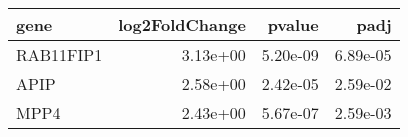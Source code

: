 \begin{tabular}{lrrr}
\toprule
     gene &  log2FoldChange &   pvalue &     padj \\
\midrule
RAB11FIP1 &        3.13e+00 & 5.20e-09 & 6.89e-05 \\
     APIP &        2.58e+00 & 2.42e-05 & 2.59e-02 \\
     MPP4 &        2.43e+00 & 5.67e-07 & 2.59e-03 \\
\bottomrule
\end{tabular}
